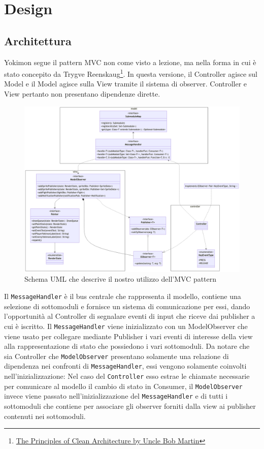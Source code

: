 \documentclass[a4paper,12pt]{report}
\begin{document}
\chapter{Design}
\section{Architettura}
Yokimon segue il pattern MVC non come visto a lezione, ma nella forma in cui è stato concepito da Trygve Reenskaug\footnote{\href{https://youtu.be/o_TH-Y78tt4?si=lk4vbCll47vFUt1A&t=1659}{The Principles of Clean Architecture by Uncle Bob Martin}}. 
%
In questa versione, il Controller agisce sul Model e il Model agisce sulla View tramite il sistema di observer. 
%
Controller e View pertanto non presentano dipendenze dirette.
\\
\begin{figure}[H]
\centering{}
\includegraphics[width=1.0\columnwidth]{images/uml-mvc.png}
\caption{Schema UML che descrive il nostro utilizzo dell'MVC pattern}
\label{img:uml-mvc}
\end{figure}
Il \texttt{MessageHandler} è il bus centrale che rappresenta il modello, contiene una selezione di sottomoduli e fornisce un sistema di comunicazione per essi, dando l’opportunità al Controller di segnalare eventi di input che riceve dai publisher a cui è iscritto.
%
Il \texttt{MessageHandler} viene inizializzato con un ModelObserver che viene usato per collegare mediante Publisher i vari eventi di interesse della view alla rappresentazione di stato che possiedono i vari sottomoduli.
%
Da notare che sia Controller che \texttt{ModelObserver} presentano solamente una relazione di dipendenza nei confronti di \texttt{MessageHandler}, essi vengono solamente coinvolti nell’inizializzazione: Nel caso del \texttt{Controller} esso estrae le chiamate necessarie per comunicare al modello il cambio di stato in Consumer, il \texttt{ModelObserver} invece viene passato nell’inizializzazione del \texttt{MessageHandler} e di tutti i sottomoduli che contiene per associare gli observer forniti dalla view ai publisher contenuti nei sottomoduli. \\
\end{document}
